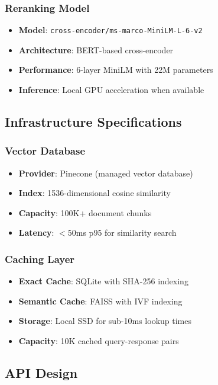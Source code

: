 \documentclass[11pt,a4paper]{article}
\begin{document}
\subsubsection{Reranking Model}
\begin{itemize}
    \item \textbf{Model}: \texttt{cross-encoder/ms-marco-MiniLM-L-6-v2}
    \item \textbf{Architecture}: BERT-based cross-encoder
    \item \textbf{Performance}: 6-layer MiniLM with 22M parameters
    \item \textbf{Inference}: Local GPU acceleration when available
\end{itemize}

\subsection{Infrastructure Specifications}

\subsubsection{Vector Database}
\begin{itemize}
    \item \textbf{Provider}: Pinecone (managed vector database)
    \item \textbf{Index}: 1536-dimensional cosine similarity
    \item \textbf{Capacity}: 100K+ document chunks
    \item \textbf{Latency}: $<50$ms p95 for similarity search
\end{itemize}

\subsubsection{Caching Layer}
\begin{itemize}
    \item \textbf{Exact Cache}: SQLite with SHA-256 indexing
    \item \textbf{Semantic Cache}: FAISS with IVF indexing
    \item \textbf{Storage}: Local SSD for sub-10ms lookup times
    \item \textbf{Capacity}: 10K cached query-response pairs
\end{itemize}

\subsection{API Design}
\end{document}

